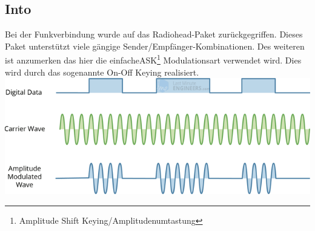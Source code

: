 \subsection{Into}
Bei der Funkverbindung wurde auf das Radiohead-Paket\cite{rh} zurückgegriffen. Dieses Paket unterstützt viele gängige Sender/Empfänger-Kombinationen. Des weiteren ist anzumerken das hier die \grqq einfache\grqq  ASK\footnote{Amplitude Shift Keying/Amplitudenumtastung} Modulationsart verwendet wird. Dies wird durch das sogenannte On-Off Keying realisiert. \newline\includegraphics[width=\textwidth]{Hauptteil/sw/intro/ask.png}